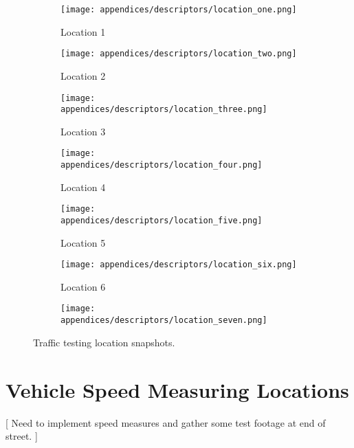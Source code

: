 \begin{figure}[H]
	\centering
	\begin{subfigure}[b]{0.45\linewidth}
        \centering\texttt{[image: appendices/descriptors/location\_one.png]}
        \caption{Location 1}
		\label{fig:location_one}
    \end{subfigure}
    \begin{subfigure}[b]{0.45\linewidth}
        \centering\texttt{[image: appendices/descriptors/location\_two.png]}
        \caption{Location 2}
        \label{fig:location_two}
    \end{subfigure}
    \begin{subfigure}[b]{0.45\linewidth}
        \centering\texttt{[image: appendices/descriptors/location\_three.png]}
        \caption{Location 3}
        \label{fig:location_three}
    \end{subfigure}
    \begin{subfigure}[b]{0.45\linewidth}
        \centering\texttt{[image: appendices/descriptors/location\_four.png]}
        \caption{Location 4}
        \label{fig:location_four}
    \end{subfigure}
    \begin{subfigure}[b]{0.45\linewidth}
        \centering\texttt{[image: appendices/descriptors/location\_five.png]}
        \caption{Location 5}
        \label{fig:location_five}
    \end{subfigure}
    \begin{subfigure}[b]{0.45\linewidth}
        \centering\texttt{[image: appendices/descriptors/location\_six.png]}
        \caption{Location 6}
        \label{fig:location_six}
    \end{subfigure}
    \begin{subfigure}[b]{0.45\linewidth}
        \centering\texttt{[image: appendices/descriptors/location\_seven.png]}
        \caption{}
        \label{fig:location_seven}
    \end{subfigure}
\caption{Traffic testing location snapshots.}
\label{fig:location_snapshots}
\end{figure}


\section{Vehicle Speed Measuring Locations}


[ Need to implement speed measures and gather some test footage at end of street. ]

